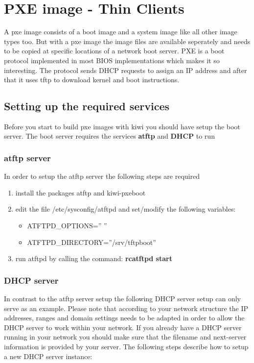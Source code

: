 \chapter{PXE image - Thin Clients}
\label{chapter:pxe}
\minitoc

A pxe image consists of a boot image and a system image like all other
 image types too. But with a pxe image the image files are available
seperately and needs to be copied at specific locations of a network
boot server. PXE is a boot protocol implemented in most BIOS implementations
which makes it so interesting. The protocol sends DHCP requests to assign
an IP address and after that it uses tftp to download kernel and boot
instructions. 

\section{Setting up the required services}

Before you start to build pxe images with kiwi you
should have setup the boot server. The boot server requires the
services \textbf{atftp} and \textbf{DHCP} to run

\subsection{atftp server}

In order to setup the atftp server the following steps are required

\begin{enumerate}
\item install the packages atftp and kiwi-pxeboot
\item edit the file /etc/sysconfig/atftpd and set/modify the following
      variables:
      \begin{itemize}
      \item ATFTPD\_OPTIONS='' ''
      \item ATFTPD\_DIRECTORY=''/srv/tftpboot''
      \end{itemize}
\item run atftpd by calling the command:
      \textbf{rcatftpd start}
\end{enumerate}

\subsection{DHCP server}

In contrast to the atftp server setup the following DHCP server setup
can only serve as an example. Please note that according to your network
structure the IP addresses, ranges and domain settings needs to be adapted
in order to allow the DHCP server to work within your network. If you
already have a DHCP server running in your network you should make sure
that the filename and next-server information is provided by your server.
The following steps describe how to setup a new DHCP server instance:

